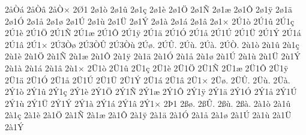 {%
2^^e5^^d2^^e1
2^^e5^^d2^^e2
2^^e5^^d2^^d7
2^^d81
2^^f81^^f2
2^^f81^^fb
2^^f81^^e7
2^^f81^^e8
2^^f81^^d6
2^^f81^^d1
2^^f81^^e6
2^^f81^^d4
2^^f81^^ff
2^^f81^^e4
2^^f81^^d3
2^^f81^^e5
2^^f81^^f8
2^^f81^^da
2^^f81^^f9
2^^f81^^dc
2^^f81^^dd
2^^f81^^e0
2^^f81^^e1
2^^f81^^e2
2^^f81^^d7
2^^da1^^f2
2^^da1^^fb
2^^da1^^e7
2^^da1^^e8
2^^da1^^d6
2^^da1^^d1
2^^da1^^e6
2^^da1^^d4
2^^da1^^ff
2^^da1^^e4
2^^da1^^d3
2^^da1^^e5
2^^da1^^da
2^^da1^^dc
2^^da1^^dd
2^^da1^^e1
2^^da1^^e2
2^^da1^^d7
2^^da3^^d2^^f8
2^^da3^^d2^^db
2^^da3^^d2^^f9
2^^da^^f8.
2^^da^^db.
2^^da^^f9.
2^^da^^e0.
2^^da^^d2.
2^^f91^^f2
2^^f91^^fb
2^^f91^^e7
2^^f91^^e8
2^^f91^^d6
2^^f91^^d1
2^^f91^^e6
2^^f91^^d4
2^^f91^^ff
2^^f91^^e4
2^^f91^^d3
2^^f91^^e5
2^^f91^^f8
2^^f91^^da
2^^f91^^f9
2^^f91^^dc
2^^f91^^dd
2^^f91^^e0
2^^f91^^e1
2^^f91^^e2
2^^f91^^d7
2^^dc1^^f2
2^^dc1^^fb
2^^dc1^^e7
2^^dc1^^e8
2^^dc1^^d6
2^^dc1^^d1
2^^dc1^^e6
2^^dc1^^d4
2^^dc1^^ff
2^^dc1^^e4
2^^dc1^^d3
2^^dc1^^e5
2^^dc1^^da
2^^dc1^^dc
2^^dc1^^dd
2^^dc1^^e1
2^^dc1^^e2
2^^dc1^^d7
2^^dc^^f8.
2^^dc^^db.
2^^dc^^f9.
2^^dc^^e0.
2^^dd1^^f2
2^^dd1^^fb
2^^dd1^^e7
2^^dd1^^e8
2^^dd1^^d6
2^^dd1^^d1
2^^dd1^^e6
2^^dd1^^d4
2^^dd1^^ff
2^^dd1^^e4
2^^dd1^^d3
2^^dd1^^e5
2^^dd1^^da
2^^dd1^^f9
2^^dd1^^dc
2^^dd1^^dd
2^^dd1^^e0
2^^dd1^^e1
2^^dd1^^e2
2^^dd1^^d7
2^^de1
2^^df^^f8.
2^^df^^db.
2^^df^^f9.
2^^df^^e0.
2^^e01^^f2
2^^e01^^fb
2^^e01^^e7
2^^e01^^e8
2^^e01^^d6
2^^e01^^d1
2^^e01^^e6
2^^e01^^d4
2^^e01^^ff
2^^e01^^e4
2^^e01^^d3
2^^e01^^e5
2^^e01^^f8
2^^e01^^da
2^^e01^^f9
2^^e01^^dc
2^^e01^^dd
}
